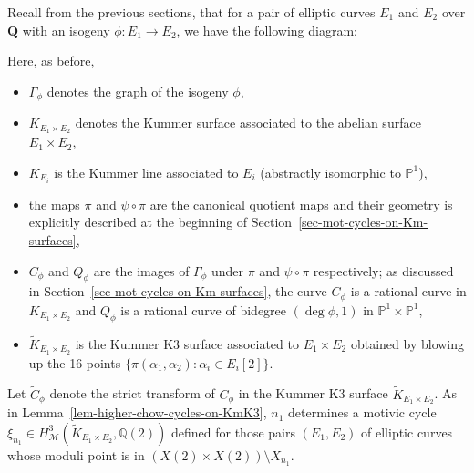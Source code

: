 \documentclass[11pt,a4paper]{article}
\def\deg{\operatorname{deg}}
\begin{document}
Recall from the previous sections, that for a pair of elliptic curves $E_1$ and $E_2$ over $\mathbf{Q}$ with an isogeny $\phi: E_1 \to E_2$, we have the following diagram:
\begin{center} 
\end{center}
Here, as before,
\begin{itemize} 
\item $\Gamma_\phi$ denotes the graph of the isogeny $\phi$,
\item $K_{E_1 \times E_2}$ denotes the Kummer surface associated to the abelian surface $E_1 \times E_2$,
\item $K_{E_i}$ is the Kummer line associated to $E_i$ (abstractly isomorphic to $\mathbb{P}^1$),
\item the maps $\pi$ and $\psi \circ \pi$ are the canonical quotient maps and their geometry is explicitly described at the beginning of Section~\ref{sec-mot-cycles-on-Km-surfaces},
\item $C_\phi$ and $Q_\phi$ are the images of $\Gamma_\phi$ under $\pi$ and $\psi \circ \pi$ respectively; as discussed in Section~\ref{sec-mot-cycles-on-Km-surfaces}, the curve $C_\phi$ is a rational curve in $K_{E_1 \times E_2}$ and $Q_\phi$ is a rational curve of bidegree $(\deg \phi, 1)$ in $\mathbb{P}^1 \times \mathbb{P}^1$,
\item $\widetilde{K}_{E_1 \times E_2}$ is the Kummer K3 surface associated to $E_1 \times E_2$ obtained by blowing up the 16 points $\{\pi(\alpha_1, \alpha_2): \alpha_i \in E_i [2]\}$.  
\end{itemize}
%
Let $\widetilde{C}_{\phi}$ denote the strict transform of $C_\phi$ in the Kummer K3 surface $\widetilde{K}_{E_1 \times E_2}$.  As in Lemma~\ref{lem-higher-chow-cycles-on-KmK3}, $n_1$ determines a motivic cycle $\xi_{n_1} \in H^3_{\mathcal{M}}(\widetilde{K}_{E_1 \times E_2}, \mathbb{Q}(2))$ defined for those pairs $(E_1, E_2)$ of elliptic curves whose moduli point is in $(X(2) \times X(2)) \setminus X_{n_1}$. 
\end{document}
